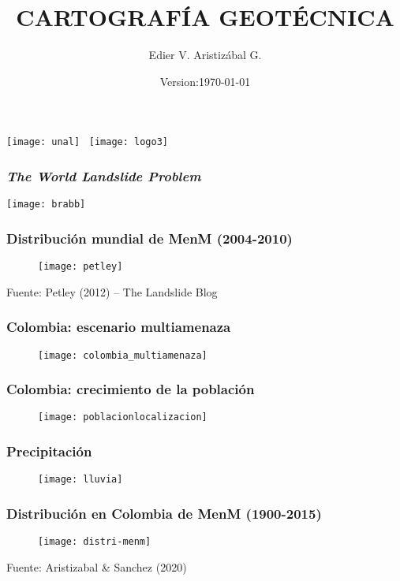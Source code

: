 \documentclass[12pt]{beamer}
\title[Geoamenazas \& Ordenamiento territorial]{CARTOGRAFÍA GEOTÉCNICA}
\author[Edier Aristizábal]{Edier V. Aristizábal G.}
\institute{\emph{evaristizabalg@unal.edu.co}}
\date{Version:\today}
\begin{document}
\begin{frame}
\titlepage
\centering
\texttt{[image: unal]}\hspace*{4.75cm}~%
\texttt{[image: logo3]} 
\end{frame}
\begin{frame}
\frametitle{\emph{The World Landslide Problem}}
\texttt{[image: brabb]}
\end{frame}
\begin{frame}
\frametitle{Distribución mundial de MenM (2004-2010)}
\begin{figure}
\centering
\texttt{[image: petley]}
\end{figure}
\tiny{Fuente: Petley (2012) – The Landslide Blog}
\end{frame}
\begin{frame}
\frametitle{Colombia: escenario multiamenaza}
\begin{figure}
\centering
\texttt{[image: colombia\_multiamenaza]}
\end{figure}
\end{frame}
\begin{frame}
\frametitle{Colombia: crecimiento de la población}
\begin{figure}
\centering
\texttt{[image: poblacionlocalizacion]}
\end{figure}
\end{frame}
\begin{frame}
\frametitle{Precipitación}
\begin{figure}
\centering
\texttt{[image: lluvia]}
\end{figure}
\end{frame}
\begin{frame}
\frametitle{Distribución en Colombia de MenM (1900-2015)}
\begin{figure}
\centering
\texttt{[image: distri-menm]}
\end{figure}
\tiny{Fuente: Aristizabal \& Sanchez (2020)}
\end{frame}
\end{document}
